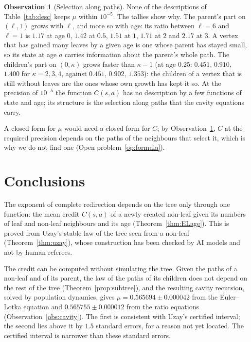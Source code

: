 \documentclass[11pt]{article}
\theoremstyle{plain}
\theoremstyle{definition}
\newtheorem{observation}[theorem]{Observation}
\theoremstyle{remark}
\begin{document}
\begin{observation}[Selection along paths]\label{obs:selection}
None of the descriptions of Table~\ref{tab:desc} keeps $\mu$ within $10^{-5}$. The tallies show why. The parent's part on $(\ell,1)$ grows with $\ell$, and more so with age: its ratio between $\ell=6$ and $\ell=1$ is $1.17$ at age $0$, $1.42$ at $0.5$, $1.51$ at $1$, $1.71$ at $2$ and $2.17$ at $3$. A vertex that has gained many leaves by a given age is one whose parent has stayed small, so its state at age $a$ carries information about the parent's whole path. The children's part on $(0,\kappa)$ grows faster than $\kappa-1$ (at age $0.25$: $0.451$, $0.910$, $1.400$ for $\kappa=2,3,4$, against $0.451$, $0.902$, $1.353$): the children of a vertex that is still without leaves are the ones whose own growth has kept it so. At the precision of $10^{-5}$ the function $C(s,a)$ has no description by a few functions of state and age; its structure is the selection along paths that the cavity equations carry.
\end{observation}

A closed form for $\mu$ would need a closed form for $C$; by Observation~\ref{obs:selection}, $C$ at the required precision depends on the paths of the neighbours that select it, which is why we do not find one (Open problem~\ref{op:formula}).

\section{Conclusions}\label{sec:conclusions}

The exponent of complete redirection depends on the tree only through one function: the mean credit $C(s,a)$ of a newly created non-leaf given its numbers of leaf and non-leaf neighbours and its age (Theorem~\ref{thm:ELage}). This is proved from Uzay's stable law of the tree seen from a non-leaf (Theorem~\ref{thm:uzay}), whose construction has been checked by AI models and not by human referees.

The credit can be computed without simulating the tree. Given the paths of a non-leaf and of its parent, the law of the paths of its children does not depend on the rest of the tree (Theorem~\ref{prop:subtree}), and the resulting cavity recursion, solved by population dynamics, gives $\mu=0.565694\pm0.000042$ from the Euler--Lotka equation and $0.565755\pm0.000012$ from the ratio equations (Observation~\ref{obs:cavity}). The first is consistent with Uzay's certified interval; the second lies above it by $1.5$ standard errors, for a reason not yet located. The certified interval is narrower than these standard errors.
\end{document}
